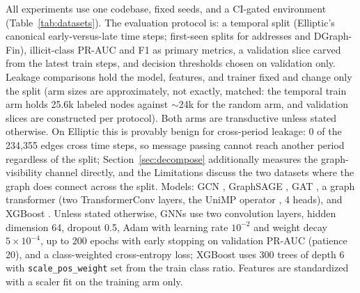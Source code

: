 \documentclass{article}
\begin{document}
\begin{table}[t]
\centering
\caption{Datasets. Drift regime is characterized in Section~\ref{sec:dose}:
Elliptic's labeled fraud prevalence collapses from 9.2\% to 2.5\% at the
dark-market shutdown (time step 43); AMLworld's laundering prevalence
doubles across the stream; DGraph-Fin's fraud rate is temporally stable.}
\label{tab:datasets}
\end{table}

All experiments use one codebase, fixed seeds, and a CI-gated environment
(Table~\ref{tab:datasets}). The evaluation protocol is: a temporal split
(Elliptic's canonical early-versus-late time steps; first-seen splits for
addresses and DGraph-Fin), illicit-class PR-AUC and F1 as primary metrics, a
validation slice carved from the latest train steps, and decision thresholds
chosen on validation only. Leakage comparisons hold the model, features, and
trainer fixed and change only the split (arm sizes are approximately, not
exactly, matched: the temporal train arm holds 25.6k labeled nodes against
$\sim$24k for the random arm, and validation slices are constructed per
protocol). Both arms are transductive unless stated otherwise. On Elliptic this
is provably benign for cross-period leakage: 0 of the 234{,}355 edges cross time
steps, so message passing cannot reach another period regardless of the split;
Section~\ref{sec:decompose} additionally measures the graph-visibility channel
directly, and the Limitations discuss the two datasets where the graph does
connect across the split. Models: GCN \citep{kipf2017gcn},
GraphSAGE \citep{hamilton2017graphsage}, GAT \citep{velickovic2018gat}, a graph
transformer (two TransformerConv layers, the UniMP operator
\citep{shi2021unimp}, 4 heads), and XGBoost \citep{chen2016xgboost}. Unless stated otherwise, GNNs use two convolution
layers, hidden dimension 64, dropout 0.5, Adam with learning rate $10^{-2}$ and
weight decay $5\times10^{-4}$, up to 200 epochs with early stopping on
validation PR-AUC (patience 20), and a class-weighted cross-entropy loss; XGBoost
uses 300 trees of depth 6 with \texttt{scale\_pos\_weight} set from the train
class ratio. Features are standardized with a scaler fit on the training arm
only.
\end{document}
